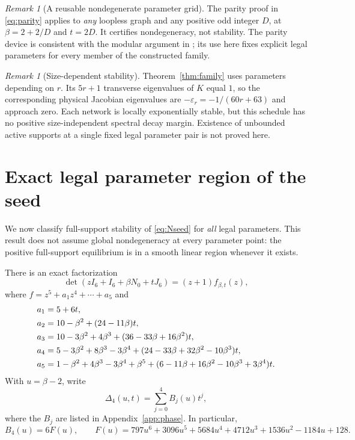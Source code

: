 \documentclass[11pt,a4paper]{article}
\theoremstyle{definition}\newtheorem{definition}[theorem]{Definition}
\theoremstyle{remark}\newtheorem{remark}[theorem]{Remark}
\newcommand{\eps}{\varepsilon}
\begin{document}
\begin{remark}[A reusable nondegenerate parameter grid]
The parity proof in \eqref{eq:parity} applies to \emph{any} loopless graph and any positive odd integer $D$, at $\beta=2+2/D$ and $t=2D$. It certifies nondegeneracy, not stability. The parity device is consistent with the modular argument in \cite{G2026}; its use here fixes explicit legal parameters for every member of the constructed family.
\end{remark}

\begin{remark}[Size-dependent stability]
Theorem~\ref{thm:family} uses parameters depending on $r$. Its $5r+1$ transverse eigenvalues of $K$ equal $1$, so the corresponding physical Jacobian eigenvalues are $-\eps_r=-1/(60r+63)$ and approach zero. Each network is locally exponentially stable, but this schedule has no positive size-independent spectral decay margin. Existence of unbounded active supports at a single fixed legal parameter pair is not proved here.
\end{remark}

\section{Exact legal parameter region of the seed}\label{sec:phase}
We now classify full-support stability of \eqref{eq:Nseed} for \emph{all} legal parameters. This result does not assume global nondegeneracy at every parameter point: the positive full-support equilibrium is in a smooth linear region whenever it exists.

There is an exact factorization
\begin{equation}\label{eq:seedquintic}
 \det(zI_6+I_6+\beta N_0+tJ_6)=(z+1)f_{\beta,t}(z),
\end{equation}
where $f=z^5+a_1z^4+\cdots+a_5$ and
\begin{align}\label{eq:seedcoefficients}
 a_1={}&5+6t,\notag\\
 a_2={}&10-\beta^2+(24-11\beta)t,\notag\\
 a_3={}&10-3\beta^2+4\beta^3+(36-33\beta+16\beta^2)t,\notag\\
 a_4={}&5-3\beta^2+8\beta^3-3\beta^4
             +(24-33\beta+32\beta^2-10\beta^3)t,\notag\\
 a_5={}&1-\beta^2+4\beta^3-3\beta^4+\beta^5
             +(6-11\beta+16\beta^2-10\beta^3+3\beta^4)t.
\end{align}
With $u=\beta-2$, write
\begin{equation}\label{eq:phaseH4}
 \Delta_4(u,t)=\sum_{j=0}^4 B_j(u)t^j,
\end{equation}
where the $B_j$ are listed in Appendix~\ref{app:phase}. In particular,
\begin{equation}\label{eq:F}
 B_4(u)=6F(u),\qquad
 F(u)=797u^6+3096u^5+5684u^4+4712u^3+1536u^2-1184u+128.
\end{equation}
\end{document}
